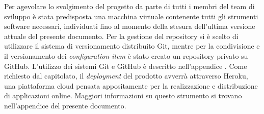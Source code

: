 			Per agevolare lo svolgimento del progetto da parte di tutti i membri del team di sviluppo è stata predisposta una macchina virtuale contenente tutti gli strumenti software necessari, individuati fino al momento della stesura dell'ultima versione attuale del presente documento.
				Per la gestione del repository si è scelto di utilizzare il sistema di versionamento distribuito Git, mentre per la condivisione e il versionamento dei \textit{configuration item} è stato creato un repository privato su GitHub.
				L'utilizzo dei sistemi Git e GitHub è descritto nell'appendice .
				Come richiesto dal capitolato, il \textit{deployment} del prodotto avverrà attraverso Heroku, una piattaforma cloud pensata appositamente per la realizzazione e distribuzione di applicazioni online. Maggiori informazioni su questo strumento si trovano nell'appendice  del presente documento.
			
